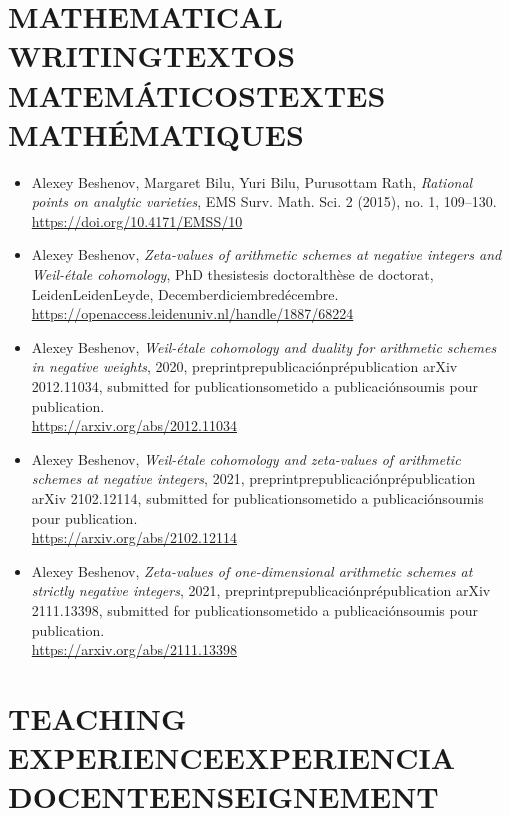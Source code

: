 \documentclass{article}
\newcommand{\biling}[3]{\ifdefined\english#1\fi\ifdefined\spanish#2\fi\ifdefined\french#3\fi}
\begin{document}
{\color{RoyalBlue}\section*{\biling{MATHEMATICAL WRITING}{TEXTOS MATEMÁTICOS}{TEXTES MATHÉMATIQUES}}}

\begin{itemize}
\item Alexey Beshenov, Margaret Bilu, Yuri Bilu, Purusottam Rath,
  \emph{Rational points on analytic varieties},
  EMS Surv. Math. Sci. 2 (2015), no. 1, 109–130.\\
  \url{https://doi.org/10.4171/EMSS/10}

\item Alexey Beshenov,
  \emph{Zeta-values of arithmetic schemes at negative integers and Weil-étale cohomology},
  \biling{PhD thesis}{tesis doctoral}{thèse de doctorat}, \biling{Leiden}{Leiden}{Leyde}, \biling{December}{diciembre}{décembre} 2018.\\
  \url{https://openaccess.leidenuniv.nl/handle/1887/68224}

\item Alexey Beshenov,
  \emph{Weil-étale cohomology and duality for arithmetic schemes in negative weights},
  2020, \biling{preprint}{prepublicación}{prépublication} arXiv 2012.11034,
  \biling{submitted for publication}{sometido a publicación}{soumis pour publication}.\\
  \url{https://arxiv.org/abs/2012.11034}

\item Alexey Beshenov,
  \emph{Weil-étale cohomology and zeta-values of arithmetic schemes at negative integers},
  2021, \biling{preprint}{prepublicación}{prépublication} arXiv 2102.12114,
  \biling{submitted for publication}{sometido a publicación}{soumis pour publication}.\\
  \url{https://arxiv.org/abs/2102.12114}

\item Alexey Beshenov,
  \emph{Zeta-values of one-dimensional arithmetic schemes at strictly negative integers},
  2021, \biling{preprint}{prepublicación}{prépublication} arXiv 2111.13398,
  \biling{submitted for publication}{sometido a publicación}{soumis pour publication}.\\
  \url{https://arxiv.org/abs/2111.13398}
\end{itemize}

{\color{RoyalBlue}\section*{\biling{TEACHING EXPERIENCE}{EXPERIENCIA DOCENTE}{ENSEIGNEMENT}}}
\end{document}
